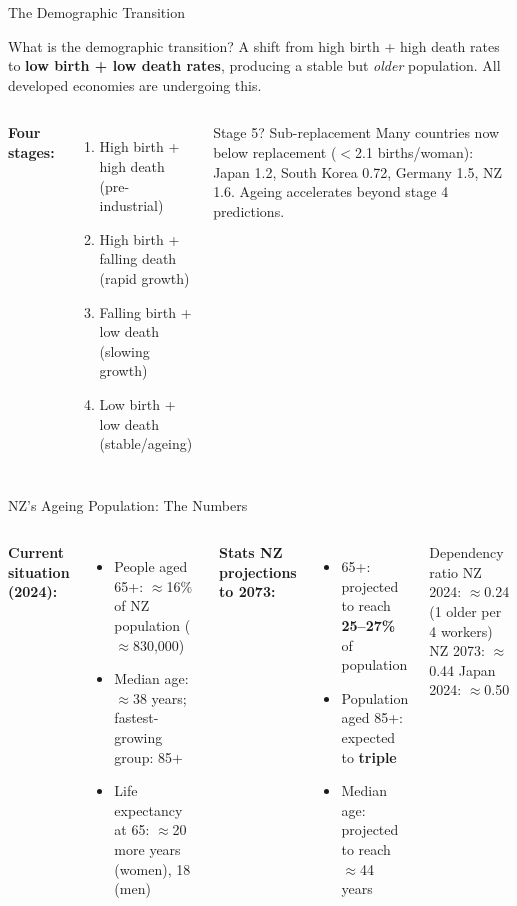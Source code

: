 \documentclass[aspectratio=169, 12pt]{beamer}
\begin{document}
\begin{frame}{The Demographic Transition}
  \begin{block}{What is the demographic transition?}
    \small
    A shift from high birth + high death rates to \textbf{low birth + low death rates},
    producing a stable but \emph{older} population. All developed economies are undergoing this.
  \end{block}
  \begin{columns}
      \small\textbf{Four stages:}
      \begin{enumerate}\small
        \item High birth + high death (pre-industrial)
        \item High birth + falling death (rapid growth)
        \item Falling birth + low death (slowing growth)
        \item Low birth + low death (stable/ageing)
      \end{enumerate}
      \begin{alertblock}{Stage 5? Sub-replacement}
        \footnotesize
        Many countries now below replacement ($<$2.1 births/woman): Japan 1.2, South Korea
        0.72, Germany 1.5, NZ 1.6. Ageing accelerates beyond stage 4 predictions.
      \end{alertblock}
  \end{columns}
\end{frame}

\begin{frame}{NZ's Ageing Population: The Numbers}
  \begin{columns}
      \small
      \textbf{Current situation (2024):}
      \begin{itemize}
        \item People aged 65+: $\approx$16\% of NZ population ($\approx$830,000)
        \item Median age: $\approx$38 years; fastest-growing group: 85+
        \item Life expectancy at 65: $\approx$20 more years (women), 18 (men)
      \end{itemize}
      \small
      \textbf{Stats NZ projections to 2073:}
      \begin{itemize}
        \item 65+: projected to reach \textbf{25--27\%} of population
        \item Population aged 85+: expected to \textbf{triple}
        \item Median age: projected to reach $\approx$44 years
      \end{itemize}
      \begin{alertblock}{Dependency ratio}
        \footnotesize
        NZ 2024: $\approx$0.24 (1 older per 4 workers)\\
        NZ 2073: $\approx$0.44 \quad Japan 2024: $\approx$0.50
      \end{alertblock}
  \end{columns}
\end{frame}
\end{document}
